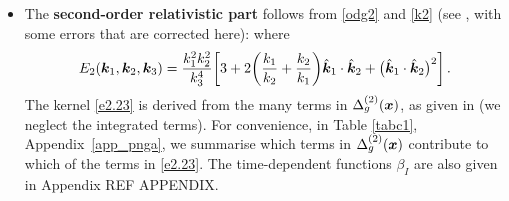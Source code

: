 {{{\begin{itemize}
\item
The {\bfseries second-order relativistic part} follows from \eqref{odg2} and \eqref{k2} (see \citep{Jolicoeur:2017eyi}, with some errors that are corrected here):
where
\begin{equation}
E_{2}(\bm{k}_{1}, \bm{k}_{2},\bm{k}_3)=\frac{k_{1}^{2}k_{2}^{2}}{k_{3}^{4}}
\bigg[3+2\bigg(\frac{k_{1}}{k_{2}} + \frac{k_{2}}{k_{1}}\bigg) \hat{\k}_1\cdot \hat{\k}_2 + \big( \hat{\k}_1\cdot \hat{\k}_2\big)^2\bigg]\,. %
\end{equation}
The kernel \eqref{e2.23} is derived from the many terms in $\Delta_g^{(2)}(\bm {x})$, as given in  \cite{Bertacca:2014dra, Bertacca:2014hwa} (we neglect the integrated terms). For convenience, in Table \ref{tabc1},  Appendix~\ref{app_pnga},  we summarise  which terms in $\Delta_g^{(2)}(\bm {x})$ contribute to which of the terms in  \eqref{e2.23}. The time-dependent functions $\beta_{I}$ are also given in Appendix REF APPENDIX.
 

\end{itemize}}}}
